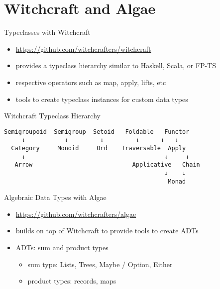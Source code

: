 \documentclass[
  ignorenonframetext,
]{beamer}
\providecommand{\tightlist}{%
  \setlength{\itemsep}{0pt}\setlength{\parskip}{0pt}}
\begin{document}
\hypertarget{witchcraft-and-algae}{%
\section{Witchcraft and Algae}\label{witchcraft-and-algae}}

\begin{frame}{Typeclasses with Witchcraft}
\protect\hypertarget{typeclasses-with-witchcraft}{}
\begin{itemize}
\tightlist
\item
  \url{https://github.com/witchcrafters/witchcraft}
\item
  provides a typeclass hierarchy similar to Haskell, Scala, or FP-TS
\item
  respective operators such as map, apply, lifts, etc
\item
  tools to create typeclass instances for custom data types
\end{itemize}
\end{frame}

\begin{frame}[fragile]{Witchcraft Typeclass Hierarchy}
\protect\hypertarget{witchcraft-typeclass-hierarchy}{}
\begin{lstlisting}
Semigroupoid  Semigroup  Setoid   Foldable   Functor
     ↓           ↓         ↓         ↓      ↓   ↓
  Category     Monoid     Ord    Traversable  Apply
     ↓                                       ↓     ↓
   Arrow                            Applicative   Chain
                                             ↓    ↓
                                              Monad
\end{lstlisting}
\end{frame}

\begin{frame}{Algebraic Data Types with Algae}
\protect\hypertarget{algebraic-data-types-with-algae}{}
\begin{itemize}
\tightlist
\item
  \url{https://github.com/witchcrafters/algae}
\item
  builds on top of Witchcraft to provide tools to create ADTs
\item
  ADTs: sum and product types

  \begin{itemize}
  \tightlist
  \item
    sum type: Lists, Trees, Maybe / Option, Either
  \item
    product types: records, maps
  \end{itemize}
\end{itemize}
\end{frame}
\end{document}
